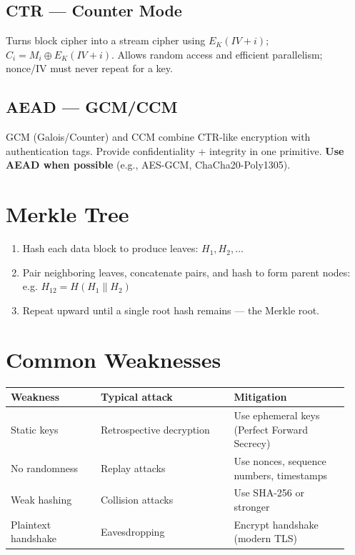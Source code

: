 \documentclass[11pt]{article}
\begin{document}
\subsection{CTR --- Counter Mode}
Turns block cipher into a stream cipher using $E_K(IV + i)$; $C_i = M_i \oplus E_K(IV+i)$. Allows random access and efficient parallelism; nonce/IV must never repeat for a key.

\subsection{AEAD --- GCM/CCM}
GCM (Galois/Counter) and CCM combine CTR-like encryption with authentication tags. Provide confidentiality + integrity in one primitive. \textbf{Use AEAD when possible} (e.g., AES-GCM, ChaCha20-Poly1305).

\section{Merkle Tree}
\begin{enumerate}
  \item Hash each data block to produce leaves: $H_1, H_2, \ldots$
  \item Pair neighboring leaves, concatenate pairs, and hash to form parent nodes: e.g. $H_{12} = H( H_1 \| H_2 )$
  \item Repeat upward until a single root hash remains --- the Merkle root.
\end{enumerate}

\section{Common Weaknesses}
\begin{longtable}{p{0.25\linewidth} p{0.37\linewidth} p{0.32\linewidth}}
\toprule
\textbf{Weakness} & \textbf{Typical attack} & \textbf{Mitigation} \\
\midrule
\endhead
Static keys & Retrospective decryption & Use ephemeral keys (Perfect Forward Secrecy) \\
No randomness & Replay attacks & Use nonces, sequence numbers, timestamps \\
Weak hashing & Collision attacks & Use SHA-256 or stronger \\
Plaintext handshake & Eavesdropping & Encrypt handshake (modern TLS) \\
\bottomrule
\end{longtable}
\end{document}
